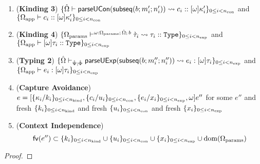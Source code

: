 \begin{theorem}
\begin{enumerate}
  \item (\textbf{Kinding 3}) $\{{\hat\Omega} \vdash \mathsf{parseUCon}(\mathsf{subseq}(b; m'_i; n'_i)) \leadsto c_i :: [\omega]\kappa'_i\}_{0 \leq i < n_\text{con}}$ and $\{\Omega_\text{app} \vdash c_i :: [\omega]\kappa'_i\}_{0 \leq i < n_\text{con}}$
  \item (\textbf{Kinding 4}) $\{\Omega_\text{params} \vdash^{\omega : \Omega_\text{params};\,{\hat\Omega};\,b} \grave{\tau}_i \leadsto \tau_i :: \texttt{Type}\}_{0 \leq i < n_\text{exp}}$ and $\{\Omega_\text{app} \vdash [\omega]\tau_i :: \texttt{Type}\}_{0 \leq i < n_\text{exp}}$
  \item (\textbf{Typing 2}) $\{{\hat\Omega} \vdash_{\hat{\Psi}; \hat\Phi} \mathsf{parseUExp}(\mathsf{subseq}(b; m''_i; n''_i)) \leadsto e_i : [\omega]\tau_i\}_{0 \leq i < n_\text{exp}}$ and $\{\Omega_\text{app} \vdash e_i : [\omega]\tau_i\}_{0 \leq i < n_\text{exp}}$
  \item (\textbf{Capture Avoidance}) $e = [\{\kappa_i/k_i\}_{0 \leq i < n_\text{kind}}, \{c_i/u_i\}_{0 \leq i < n_\text{con}}, \{e_i/x_i\}_{0 \leq i < n_\text{exp}}, \omega]e''$ for some $e''$ and fresh $\{k_i\}_{0 \leq i < n_\text{kind}}$ and fresh $\{u_i\}_{0 \leq i < n_\text{con}}$ and fresh $\{x_i\}_{0 \leq i < n_\text{exp}}$
  \item (\textbf{Context Independence}) \[\mathsf{fv}(e'') \subset \{k_i\}_{0 \leq i < n_\text{kind}} \cup \{u_i\}_{0 \leq i < n_\text{con}} \cup \{x_i\}_{0 \leq i < n_\text{exp}} \cup \text{dom}(\Omega_\text{params})\]
\end{enumerate}
\end{theorem}
\begin{proof}  \end{proof}

